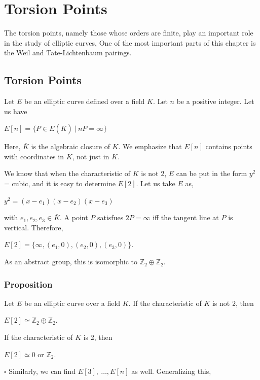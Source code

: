 \documentclass[a4paper, 12pt]{article}
\begin{document}
\section * {Torsion Points}
The torsion points, namely those whose orders are finite, play an important role in the study of elliptic curves, One of the most important parts of this chapter is the Weil and Tate-Lichtenbaum pairings. 
\subsection {Torsion Points}
Let $E$ be an elliptic curve defined over a field $K$. Let $n$ be a positive integer. Let us have
\begin{center}
$ E[n] = \{P \in E(\bar{K}) \: | \: nP = \infty\} $
\end{center}
Here, $\bar{K}$ is the algebraic closure of $K$. We emphasize that $E[n]$ contains points with coordinates in $\bar{K}$, not just in $K$. \par
We know that when the characteristic of $K$ is not 2, $E$ can be put in the form $y^2$ = cubic, and it is easy to determine $E[2]$. Let us take $E$ as,
\begin{center} $y^2 = (x-e_1)(x-e_2)(x-e_3)$ \end{center}
with $e_1,e_2,e_3 \in \bar{K}$. A point $P$ satisfues $2P = \infty$ iff the tangent line at $P$ is vertical. Therefore,
\begin{center} $E[2] = \{\infty, (e_1,0), (e_2,0), (e_3,0) \} $. \end{center}
As an abstract group, this is isomorphic to $\mathbb{Z}_2 \oplus \mathbb{Z}_2$.
\subsubsection {Proposition}
Let $E$ be an elliptic curve over a field $K$. If the characteristic of $K$ is not 2, then
\begin{center} $E[2] \simeq \mathbb{Z}_2 \oplus \mathbb{Z}_2$. \end{center}
If the characteristic of $K$ is 2, then
\begin{center} $E[2] \simeq 0$ or $\mathbb{Z}_2.$ \end{center} $\square$ \newline
Similarly, we can find $E[3],\: \dotso, E[n]$ as well. Generalizing this, 
\end{document}
